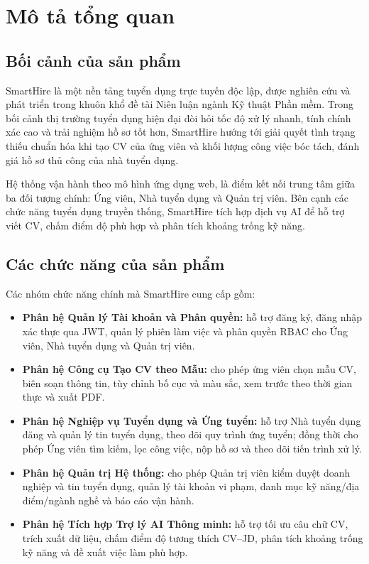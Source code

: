
\clearpage

\section{Mô tả tổng quan}

\subsection{Bối cảnh của sản phẩm}

SmartHire là một nền tảng tuyển dụng trực tuyến độc lập, được nghiên cứu và phát triển trong khuôn khổ đề tài Niên luận ngành Kỹ thuật Phần mềm. Trong bối cảnh thị trường tuyển dụng hiện đại đòi hỏi tốc độ xử lý nhanh, tính chính xác cao và trải nghiệm hồ sơ tốt hơn, SmartHire hướng tới giải quyết tình trạng thiếu chuẩn hóa khi tạo CV của ứng viên và khối lượng công việc bóc tách, đánh giá hồ sơ thủ công của nhà tuyển dụng.

Hệ thống vận hành theo mô hình ứng dụng web, là điểm kết nối trung tâm giữa ba đối tượng chính: Ứng viên, Nhà tuyển dụng và Quản trị viên. Bên cạnh các chức năng tuyển dụng truyền thống, SmartHire tích hợp dịch vụ AI để hỗ trợ viết CV, chấm điểm độ phù hợp và phân tích khoảng trống kỹ năng.

\subsection{Các chức năng của sản phẩm}

\noindent Các nhóm chức năng chính mà SmartHire cung cấp gồm:

\begin{itemize}
    \item \textbf{Phân hệ Quản lý Tài khoản và Phân quyền:} hỗ trợ đăng ký, đăng nhập xác thực qua JWT, quản lý phiên làm việc và phân quyền RBAC cho Ứng viên, Nhà tuyển dụng và Quản trị viên.
    \item \textbf{Phân hệ Công cụ Tạo CV theo Mẫu:} cho phép ứng viên chọn mẫu CV, biên soạn thông tin, tùy chỉnh bố cục và màu sắc, xem trước theo thời gian thực và xuất PDF.
    \item \textbf{Phân hệ Nghiệp vụ Tuyển dụng và Ứng tuyển:} hỗ trợ Nhà tuyển dụng đăng và quản lý tin tuyển dụng, theo dõi quy trình ứng tuyển; đồng thời cho phép Ứng viên tìm kiếm, lọc công việc, nộp hồ sơ và theo dõi tiến trình xử lý.
    \item \textbf{Phân hệ Quản trị Hệ thống:} cho phép Quản trị viên kiểm duyệt doanh nghiệp và tin tuyển dụng, quản lý tài khoản vi phạm, danh mục kỹ năng/địa điểm/ngành nghề và báo cáo vận hành.
    \item \textbf{Phân hệ Tích hợp Trợ lý AI Thông minh:} hỗ trợ tối ưu câu chữ CV, trích xuất dữ liệu, chấm điểm độ tương thích CV--JD, phân tích khoảng trống kỹ năng và đề xuất việc làm phù hợp.
\end{itemize}


